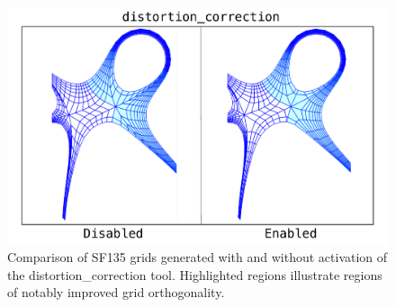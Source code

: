 



\begin{figure}[H]
    \centering
    \includegraphics[width=\linewidth]{figures/distortion_correction_1.pdf}
    \caption{Comparison of SF135 grids generated with and without activation of the distortion\_correction tool. Highlighted regions illustrate regions of notably improved grid orthogonality.}
    \label{fig:distortion_correction}
\end{figure}

